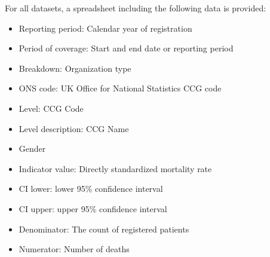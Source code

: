 For all datasets, a spreadsheet including the following data is provided:

\begin{itemize}
    \item Reporting period: Calendar year of registration
    \item Period of coverage: Start and end date or reporting period
    \item Breakdown: Organization type
    \item ONS code: UK Office for National Statistics CCG code
    \item Level: CCG Code
    \item Level description: CCG Name
    \item Gender
    \item Indicator value: Directly standardized mortality rate
    \item CI lower: lower 95\% confidence interval
    \item CI upper: upper 95\% confidence interval
    \item Denominator: The count of registered patients
    \item Numerator: Number of deaths
\end{itemize}